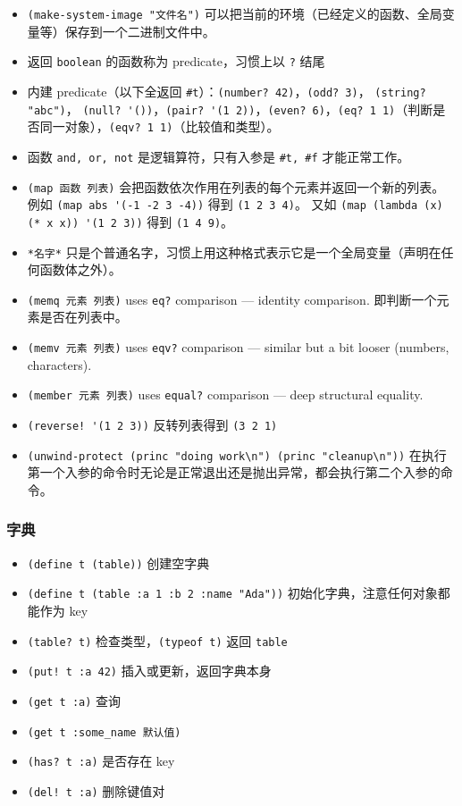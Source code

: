 \begin{itemize}
\item \verb`(make-system-image "文件名")` 可以把当前的环境（已经定义的函数、全局变量等）保存到一个二进制文件中。
\item 返回 \verb`boolean` 的函数称为 predicate，习惯上以 \verb`?` 结尾
\item 内建 predicate（以下全返回 \verb`#t`）：\verb`(number? 42)`，\verb`(odd? 3)`， \verb`(string? "abc")`， \verb`(null? '())`，\verb`(pair? '(1 2))`，\verb`(even? 6)`，\verb`(eq? 1 1)`（判断是否同一对象），\verb`(eqv? 1 1)`（比较值和类型）。
\item 函数 \verb`and, or, not` 是逻辑算符，只有入参是 \verb`#t, #f` 才能正常工作。
\item \verb`(map 函数 列表)` 会把函数依次作用在列表的每个元素并返回一个新的列表。 例如 \verb`(map abs '(-1 -2 3 -4))` 得到 \verb`(1 2 3 4)`。 又如 \verb`(map (lambda (x) (* x x)) '(1 2 3))` 得到 \verb`(1 4 9)`。
\item \verb`*名字*` 只是个普通名字，习惯上用这种格式表示它是一个全局变量（声明在任何函数体之外）。
\item \verb`(memq 元素 列表)` uses \verb`eq?` comparison — identity comparison. 即判断一个元素是否在列表中。
\item \verb`(memv 元素 列表)` uses \verb`eqv?` comparison — similar but a bit looser (numbers, characters).
\item \verb`(member 元素 列表)` uses \verb`equal?` comparison — deep structural equality.
\item \verb`(reverse! '(1 2 3))` 反转列表得到 \verb`(3 2 1)`
\item \verb`(unwind-protect (princ "doing work\n") (princ "cleanup\n"))` 在执行第一个入参的命令时无论是正常退出还是抛出异常，都会执行第二个入参的命令。
\end{itemize}

\subsubsection{字典}
\begin{itemize}
\item \verb`(define t (table))` 创建空字典
\item \verb`(define t (table :a 1 :b 2 :name "Ada"))` 初始化字典，注意任何对象都能作为 key
\item \verb`(table? t)` 检查类型，\verb`(typeof t)` 返回 \verb`table`
\item \verb`(put! t :a 42)` 插入或更新，返回字典本身
\item \verb`(get t :a)` 查询
\item \verb`(get t :some_name 默认值)` 
\item \verb`(has? t :a)` 是否存在 key
\item \verb`(del! t :a)` 删除键值对
\end{itemize}


